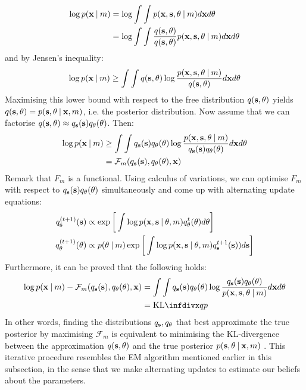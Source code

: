 \documentclass[../main.tex]{subfiles}
\begin{document}
\begin{align*}\label{eq:marginal}
\log{p(\mathbf{x} \:\vert\: m)} &= \log{\int\int p(\mathbf{x}, \mathbf{s}, \theta \:\vert\: m) d\mathbf{x} d\theta}\\
&= \log{\int\int \frac{q(\mathbf{s}, \theta)}{q(\mathbf{s}, \theta)}p(\mathbf{x}, \mathbf{s}, \theta \:\vert\: m) d\mathbf{x} d\theta}
\end{align*}
and by Jensen's inequality:
\begin{equation*}\label{eq:jensen}
\log{p(\mathbf{x} \:\vert\: m)} \geq  \int\int q(\mathbf{s}, \theta)\log{\frac{p(\mathbf{x}, \mathbf{s}, \theta \:\vert\: m)}{q(\mathbf{s}, \theta)}} d\mathbf{x} d\theta
\end{equation*}
Maximising this lower bound with respect to the free distribution $q(\mathbf{s}, \theta)$ yields $q(\mathbf{s}, \theta) = p(\mathbf{s}, \theta \:\vert\: \mathbf{x}, m)$, i.e. the posterior distribution. Now assume that we can factorise $q(\mathbf{s}, \theta) \approx q_{\mathbf{s}}(\mathbf{s})q_{\theta}(\theta)$. Then:
\begin{align*}
\log{p(\mathbf{x} \:\vert\: m)} &\geq  \int\int q_{\mathbf{s}}(\mathbf{s})q_{\theta}(\theta)\log{\frac{p(\mathbf{x}, \mathbf{s}, \theta \:\vert\: m)}{q_{\mathbf{s}}(\mathbf{s})q_{\theta}(\theta)}} d\mathbf{x} d\theta \\
 &= \mathcal{F}_m(q_{\mathbf{s}}(\mathbf{s}), q_{\theta}(\theta), \mathbf{x})
\end{align*}
Remark that $F_m$ is a functional. Using calculus of variations, we can optimise $F_m$ with respect to $q_{\mathbf{s}}(\mathbf{s})q_{\theta}(\theta)$ simultaneously and come up with alternating update equations:
\begin{align*}
q_{\mathbf{s}}^{(t+1)}(\mathbf{s}) &\propto \exp{ \bigg[ \int \log{p(\mathbf{x}, \mathbf{s} \:\vert\: \theta, m)} q_\theta^t(\theta) d\theta \bigg] } \\
q_{\theta}^{(t+1)}(\theta) &\propto p(\theta \:\vert\: m) \exp{\bigg[ \int \log{p(\mathbf{x}, \mathbf{s} \:\vert\: \theta, m)} q_{\mathbf{s}}^{t+1}(\mathbf{s}))d\mathbf{s} \bigg]}
\end{align*}
Furthermore, it can be proved that the following holds:
\begin{align*}
\log{p(\V{x} \given m)} - \mathcal{F}_m(q_{\V{s}}(\V{s}), q_{\theta}(\theta), \V{x}) &= \int\int q_{\V{s}}(\V{s})q_{\theta}(\theta)\log{\frac{q_{\V{s}}(\V{s})q_{\theta}(\theta)}{p(\V{x}, \V{s}, \theta \given m)}} d\V{x} d\theta\\ &= \text{KL}\infdiv{q}{p}
\end{align*}
In other words, finding the distributions $q_{\mathbf{s}}, q_\theta$ that best approximate the true posterior by maximising $\mathcal{F}_m$ is equivalent to minimising the KL-divergence between the approximation $q(\mathbf{s}, \theta)$ and the true posterior $p(\mathbf{s}, \theta \:\vert\: \mathbf{x}, m)$ \cite{Ghahramani2003}. This iterative procedure resembles the EM algorithm mentioned earlier in this subsection, in the sense that we make alternating updates to estimate our beliefs about the parameters.
\end{document}
